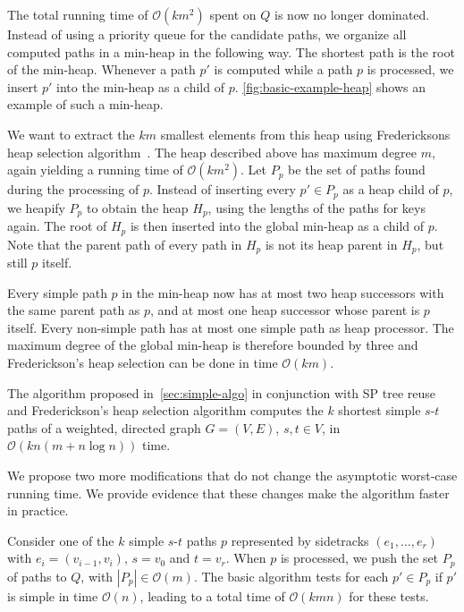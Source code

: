 \documentclass[runningheads,a4paper]{llncs}
\newcommand{\norm}[1]{\left|#1\right|}
\begin{document}
The total running time of $\mathcal O(km^2)$ spent on $Q$ is now no longer dominated.
Instead of using a priority queue for the candidate paths, we organize all computed paths in a min-heap in the following way.
The shortest path is the root of the min-heap.
Whenever a path $p'$ is computed while a path $p$ is processed, we insert $p'$ into the min-heap as a child of $p$.
\autoref{fig:basic-example-heap} shows an example of such a min-heap.

We want to extract the $km$ smallest elements from this heap using Fredericksons heap selection algorithm~\cite{DBLP:journals/iandc/Frederickson93}.
The heap described above has maximum degree $m$, again yielding a running time of $\mathcal O(km^2)$.
Let $P_p$ be the set of paths found during the processing of $p$.
Instead of inserting every $p' \in P_p$ as a heap child of $p$, we heapify $P_p$ to obtain the heap $H_p$, using the lengths of the paths for keys again.
The root of $H_p$ is then inserted into the global min-heap as a child of $p$.
Note that the parent path of every path in $H_p$ is not its heap parent in $H_p$, but still $p$ itself.

Every simple path $p$ in the min-heap now has at most two heap successors with the same parent path as $p$, and at most one heap successor whose parent is $p$ itself.
Every non-simple path has at most one simple path as heap processor.
The maximum degree of the global min-heap is therefore bounded by three and Frederickson's heap selection can be done in time $\mathcal O(km)$.

\begin{corollary}
    The algorithm proposed in~\autoref{sec:simple-algo} in conjunction with SP tree reuse and Frederickson's heap selection algorithm computes the $k$ shortest simple $s$-$t$ paths of a weighted, directed graph $G = (V, E)$, $s, t \in V$, in $\mathcal O(kn(m + n \log n))$ time.
\end{corollary}

We propose two more modifications that do not change the asymptotic worst-case running time.
We provide evidence that these changes make the algorithm faster in practice.

Consider one of the $k$ simple $s$-$t$ paths $p$ represented by sidetracks $(e_1, \ldots, e_r)$ with $e_i = (v_{i - 1}, v_i)$, $s = v_0$ and $t = v_r$.
When $p$ is processed, we push the set $P_p$ of paths to $Q$, with $\norm{P_p} \in \mathcal O(m)$.
The basic algorithm tests for each $p' \in P_p$ if $p'$ is simple in time $\mathcal O(n)$, leading to a total time of $\mathcal O(kmn)$ for these tests.
\end{document}

